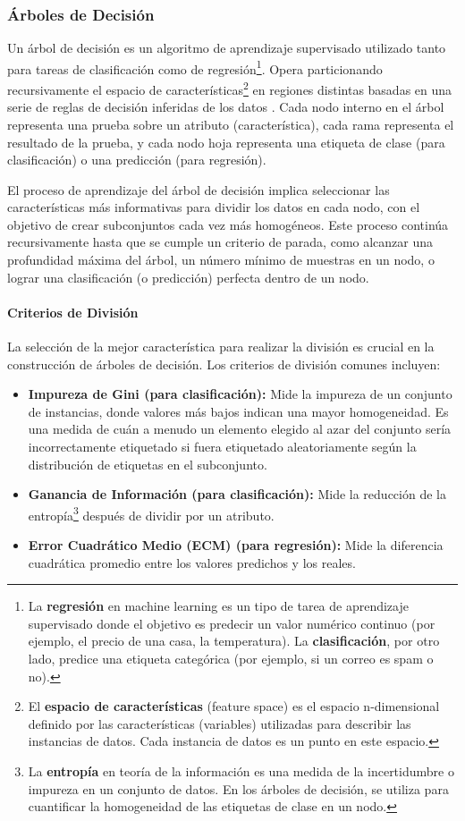 \subsubsection{Árboles de Decisión}
Un árbol de decisión es un algoritmo de aprendizaje supervisado utilizado tanto para tareas de clasificación como de regresión\footnote{La \textbf{regresión} en machine learning es un tipo de tarea de aprendizaje supervisado donde el objetivo es predecir un valor numérico continuo (por ejemplo, el precio de una casa, la temperatura).
La \textbf{clasificación}, por otro lado, predice una etiqueta categórica (por ejemplo, si un correo es spam o no).}.
Opera particionando recursivamente el espacio de características\footnote{El \textbf{espacio de características} (feature space) es el espacio n-dimensional definido por las características (variables) utilizadas para describir las instancias de datos.
Cada instancia de datos es un punto en este espacio.} en regiones distintas basadas en una serie de reglas de decisión inferidas de los datos \parencite{quinlan1986induction}.
Cada nodo interno en el árbol representa una prueba sobre un atributo (característica), cada rama representa el resultado de la prueba, y cada nodo hoja representa una etiqueta de clase (para clasificación) o una predicción (para regresión).

El proceso de aprendizaje del árbol de decisión implica seleccionar las características más informativas para dividir los datos en cada nodo, con el objetivo de crear subconjuntos cada vez más homogéneos.
Este proceso continúa recursivamente hasta que se cumple un criterio de parada, como alcanzar una profundidad máxima del árbol, un número mínimo de muestras en un nodo, o lograr una clasificación (o predicción) perfecta dentro de un nodo.

\paragraph{Criterios de División}
La selección de la mejor característica para realizar la división es crucial en la construcción de árboles de decisión.
Los criterios de división comunes incluyen:

\begin{itemize}
    \item \textbf{Impureza de Gini (para clasificación):} Mide la impureza de un conjunto de instancias, donde valores más bajos indican una mayor homogeneidad.
Es una medida de cuán a menudo un elemento elegido al azar del conjunto sería incorrectamente etiquetado si fuera etiquetado aleatoriamente según la distribución de etiquetas en el subconjunto.
    \item \textbf{Ganancia de Información (para clasificación):} Mide la reducción de la entropía\footnote{La \textbf{entropía} en teoría de la información es una medida de la incertidumbre o impureza en un conjunto de datos.
En los árboles de decisión, se utiliza para cuantificar la homogeneidad de las etiquetas de clase en un nodo.} después de dividir por un atributo.
    \item \textbf{Error Cuadrático Medio (ECM) (para regresión):} Mide la diferencia cuadrática promedio entre los valores predichos y los reales.
\end{itemize}

